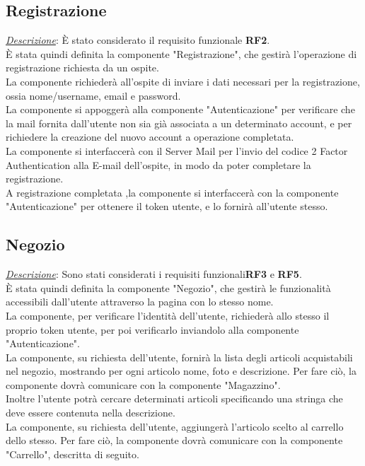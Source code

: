 \documentclass{report}
\begin{document}
\subsection*{Registrazione}
\uline{\textit{Descrizione}}:
È stato considerato il requisito funzionale \textbf{RF2}.\\
È stata quindi definita la componente "Registrazione", che gestirà l'operazione di registrazione richiesta da un ospite.\\
La componente richiederà all'ospite di inviare i dati necessari per la registrazione, ossia nome/username, email e password.\\
La componente si appoggerà alla componente "Autenticazione" per verificare che la mail fornita dall'utente non sia già associata a un determinato account, e per richiedere la creazione del nuovo account a operazione completata.\\
La componente si interfaccerà con il Server Mail per l'invio del codice 2 Factor Authentication alla E-mail dell'ospite, in modo da poter completare la registrazione.\\
A registrazione completata ,la componente si interfaccerà con la componente "Autenticazione" per ottenere il token utente, e lo fornirà all'utente stesso.

\subsection*{Negozio}
\uline{\textit{Descrizione}}:
Sono stati considerati i requisiti funzionali\textbf{RF3} e \textbf{RF5}.\\
È stata quindi definita la componente "Negozio", che gestirà le funzionalità accessibili dall'utente attraverso la pagina con lo stesso nome.\\
La componente, per verificare l'identità dell'utente, richiederà allo stesso il proprio token utente, per poi verificarlo inviandolo alla componente "Autenticazione".\\
La componente, su richiesta dell'utente, fornirà la lista degli articoli acquistabili nel negozio, mostrando per ogni articolo nome, foto e descrizione. Per fare ciò, la componente dovrà comunicare con la componente "Magazzino".\\
Inoltre l'utente potrà cercare determinati articoli specificando una stringa che deve essere contenuta nella descrizione.\\
La componente, su richiesta dell'utente, aggiungerà l'articolo scelto al carrello dello stesso. Per fare ciò, la componente dovrà comunicare con la componente "Carrello", descritta di seguito. 
\end{document}
